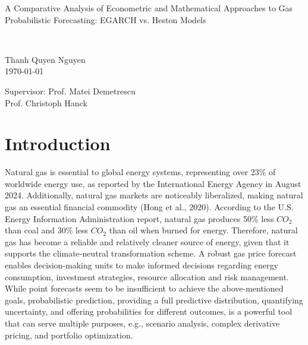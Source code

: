 \documentclass[12pt,a4paper]{article}
\numberwithin{equation}{section}
\begin{document}
\begin{titlepage}
\begin{center}
   \vspace{3cm}

\begin{large}
A Comparative Analysis of Econometric and Mathematical Approaches to Gas Probabilistic Forecasting: EGARCH vs. Heston Models
\end{large}\\
\color{black}
  \vspace{1cm}
\begin{large}
Thanh Quyen Nguyen\\
 \today                    
 \end{large}

   \vspace{3cm}
\begin{large}
   Supervisor: Prof. Matei Demetrescu\\
   \hspace{2cm} Prof. Christoph Hanck
\end{large}

  \end{center}
 \end{titlepage}

\newpage

{
  \hypersetup{linkcolor=black}
  \renewcommand{\baselinestretch}{1.5}\normalsize 
  \tableofcontents
  \listoffigures
  \listoftables
  \thispagestyle{empty}
}


\newpage
\setcounter{page}{1}
\section{Introduction}
\renewcommand{\baselinestretch}{1.5}\normalsize 


Natural gas is essential to global energy systems, representing over 23\% of worldwide energy use, as reported by the International Energy Agency in August 2024. Additionally, natural gas markets are noticeably liberalized, making natural gas an essential financial commodity (Hong et al., 2020). According to the U.S. Energy Information Administration report, natural gas produces 50\% less $CO_2$ than coal and 30\% less $CO_2$ than oil when burned for energy. Therefore, natural gas has become a reliable and relatively cleaner source of energy, given that it supports the climate-neutral transformation scheme. A robust gas price forecast enables decision-making units to make informed decisions regarding energy consumption, investment strategies, resource allocation and risk management. While point forecasts seem to be insufficient to achieve the above-mentioned goals, probabilistic prediction, providing a full predictive distribution, quantifying uncertainty, and offering probabilities for different outcomes, is a powerful tool that can serve multiple purposes, e.g., scenario analysis, complex derivative pricing, and portfolio optimization.
\end{document}
